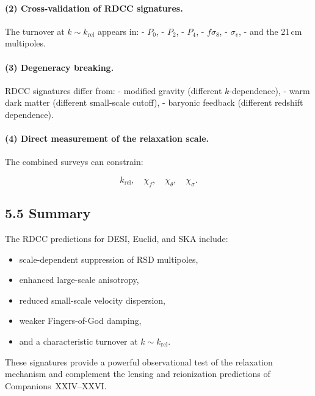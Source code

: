 \documentclass[11pt,a4paper]{article}
\begin{document}
\paragraph{(2) Cross-validation of RDCC signatures.}
The turnover at $k \sim k_{\mathrm{rel}}$ appears in:
- $P_{0}$,  
- $P_{2}$,  
- $P_{4}$,  
- $f\sigma_{8}$,  
- $\sigma_{v}$,  
- and the 21\,cm multipoles.

\paragraph{(3) Degeneracy breaking.}
RDCC signatures differ from:
- modified gravity (different $k$-dependence),  
- warm dark matter (different small-scale cutoff),  
- baryonic feedback (different redshift dependence).

\paragraph{(4) Direct measurement of the relaxation scale.}
The combined surveys can constrain:


\[
k_{\mathrm{rel}},\quad
\chi_{f},\quad
\chi_{\theta},\quad
\chi_{\sigma}.
\]



\subsection{5.5 Summary}

The RDCC predictions for DESI, Euclid, and SKA include:
\begin{itemize}
\item scale-dependent suppression of RSD multipoles,
\item enhanced large-scale anisotropy,
\item reduced small-scale velocity dispersion,
\item weaker Fingers-of-God damping,
\item and a characteristic turnover at $k \sim k_{\mathrm{rel}}$.
\end{itemize}

These signatures provide a powerful observational test of the relaxation mechanism and
complement the lensing and reionization predictions of Companions~XXIV–XXVI.

\appendix
\end{document}
